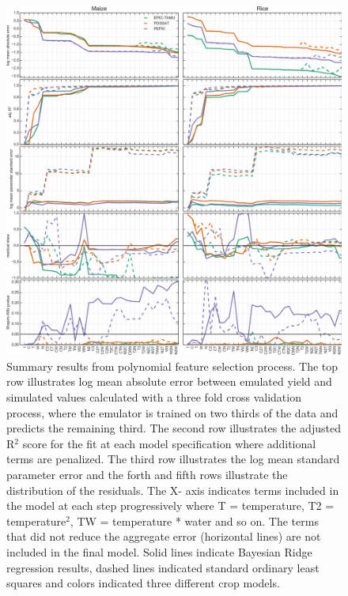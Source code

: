 \documentclass[gmd, manuscript]{copernicus} %
\begin{document}
\begin{figure}[ht]
\centering
   \includegraphics[width=12cm]{figures/model_select_maize_rice.png}
   \caption{
   Summary results from polynomial feature selection process.
   The top row illustrates log mean absolute error between emulated yield and simulated values calculated with a three fold cross validation process, where the emulator is trained on two thirds of the data and predicts the remaining third.
   The second row illustrates the adjusted R$^2$ score for the fit at each model specification where additional terms are penalized.
   The third row illustrates the log mean standard parameter error and the forth and fifth rows illustrate the distribution of the residuals.
   The X- axis indicates terms included in the model at each step progressively where T = temperature, T2 = temperature$^{2}$, TW  = temperature * water and so on. 
   The terms that did not reduce the aggregate error (horizontal lines) are not included in the final model. 
   Solid lines indicate Bayesian Ridge regression results, dashed lines indicated standard ordinary least squares and colors indicated three different crop models.
   }
   \label{fig:features}
\end{figure}
\end{document}
